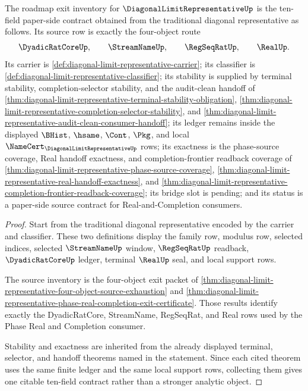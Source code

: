 \begin{theorem}
\label{thm:diagonal-limit-representative-roadmap-exit-inventory}
The roadmap exit inventory for $\DiagonalLimitRepresentativeUp$ is the ten-field paper-side contract obtained from the traditional diagonal representative as follows. Its source row is exactly the four-object route
$$
\DyadicRatCoreUp,\qquad \StreamNameUp,\qquad \RegSeqRatUp,\qquad \RealUp.
$$
Its carrier is \autoref{def:diagonal-limit-representative-carrier}; its classifier is \autoref{def:diagonal-limit-representative-classifier}; its stability is supplied by terminal stability, completion-selector stability, and the audit-clean handoff of \autoref{thm:diagonal-limit-representative-terminal-stability-obligation}, \autoref{thm:diagonal-limit-representative-completion-selector-stability}, and \autoref{thm:diagonal-limit-representative-audit-clean-consumer-handoff}; its ledger remains inside the displayed $\BHist$, $\hsame$, $\Cont$, $\Pkg$, and local $\NameCert_{\DiagonalLimitRepresentativeUp}$ rows; its exactness is the phase-source coverage, Real handoff exactness, and completion-frontier readback coverage of \autoref{thm:diagonal-limit-representative-phase-source-coverage}, \autoref{thm:diagonal-limit-representative-real-handoff-exactness}, and \autoref{thm:diagonal-limit-representative-completion-frontier-readback-coverage}; its bridge slot is pending; and its status is a paper-side source contract for Real-and-Completion consumers.
\end{theorem}
\begin{proof}
Start from the traditional diagonal representative encoded by the carrier and classifier. These two definitions display the family row, modulus row, selected indices, selected $\StreamNameUp$ window, $\RegSeqRatUp$ readback, $\DyadicRatCoreUp$ ledger, terminal $\RealUp$ seal, and local support rows.

The source inventory is the four-object exit packet of \autoref{thm:diagonal-limit-representative-four-object-source-exhaustion} and \autoref{thm:diagonal-limit-representative-phase-real-completion-exit-certificate}. Those results identify exactly the DyadicRatCore, StreamName, RegSeqRat, and Real rows used by the Phase Real and Completion consumer.

Stability and exactness are inherited from the already displayed terminal, selector, and handoff theorems named in the statement. Since each cited theorem uses the same finite ledger and the same local support rows, collecting them gives one citable ten-field contract rather than a stronger analytic object.
\end{proof}

